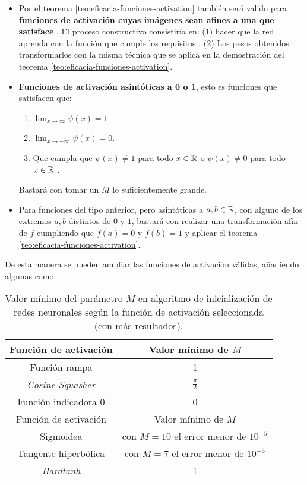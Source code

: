 \begin{itemize}
    \item Por el teorema \ref{teo:eficacia-funciones-activation} también será valido para 
    \textbf{funciones de activación cuyas imágenes sean
     afines a una que satisface }. 
     El proceso constructivo consistiría en: 
     (1) hacer que la red aprenda con la función que cumple los requisitos .
      (2) Los pesos obtenidos transformarlos con la misma técnica 
      que se aplica en la demostración del teorema \ref{teo:eficacia-funciones-activation}. 
    
    \item  \textbf{Funciones de activación asintóticas a 0 o 1}, esto es funciones que satisfacen que: 
    \begin{enumerate}
        \item $\lim _{x \rightarrow \infty} \psi(x) = 1
        $.
        \item $\lim _{x \rightarrow -\infty} \psi(x) = 0$.
        \item Que cumpla que $\psi(x) \neq 1$ para todo  $x\in \mathbb{R}$  o $\psi(x) \neq 0$ para todo $x\in \mathbb{R}$ .
    \end{enumerate}
    Bastará con tomar un $M$ lo suficientemente grande. 
    \item Para funciones del tipo anterior, pero asintóticas a $a,b \in \mathbb{R}$, con alguno de los extremos $a,b$ distintos de $0$ y $1$, bastará con realizar una transformación afín de $f$ cumpliendo que $f(a)= 0$ y $f(b)= 1$ y aplicar el teorema \ref{teo:eficacia-funciones-activation}. 
\end{itemize}

De esta manera se pueden ampliar las funciones de activación válidas, añadiendo algunas como: 

\begin{table}[H]
    \centering
    \begin{tabular}{|c|c|}
    \hline
        Función de activación  & Valor mínimo de $M$ \\ \hline
        Función rampa & 1 \\ \hline
        \textit{Cosine Squasher} & $\frac{\pi}{2}$ \\ \hline
        Función indicadora 0 & 0 \\ \hline
        Función de activación  & Valor mínimo de $M$ \\ \hline
        Sigmoidea  & con $M=10$ el error menor de $10^{-5}$\\ \hline
        Tangente hiperbólica  &  con $M=7$ el error menor de $10^{-5}$\\ \hline
        \textit{Hardtanh} & 1 \\ \hline
    \end{tabular}
    \caption{Valor mínimo del parámetro $M$ en algoritmo de inicialización de redes neuronales según la función de activación seleccionada (con más resultados).}
    \label{table:M-activation-function-2}
\end{table}

